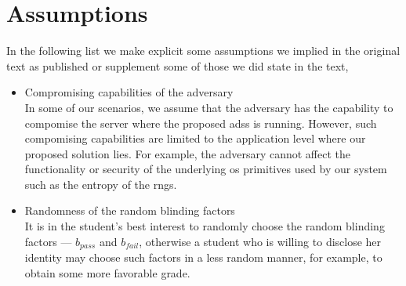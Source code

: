 \section{Assumptions}
    \label{section:thesis:appendix:dss:assumptions}
In the following list we make explicit some assumptions we implied in the original 
text as published or supplement some of those we did state in the text,
\begin{itemize}
    \item Compromising capabilities of the adversary\\
    In some of our scenarios, we assume that the adversary has the capability to 
    compomise the server where the proposed \Ac{adss} is running. However, such 
    compomising capabilities are limited to the application level where our proposed 
    solution lies. For example, the adversary cannot affect the functionality or 
    security of the underlying \ac{os} primitives used by our system such as the 
    entropy of the \acp{rng}.
    
    \item Randomness of the random blinding factors\\
    It is in the student's best interest to randomly choose the random blinding 
    factors --- $b_{pass}$ and $b_{fail}$, otherwise a student who is willing to 
    disclose her identity may choose such factors in a less random manner, for example, 
    to obtain some more favorable grade.
    
\end{itemize}


